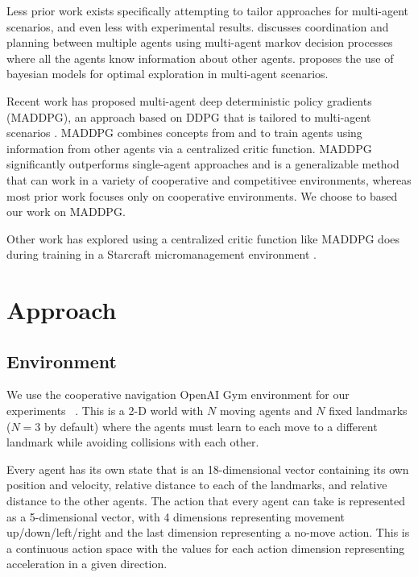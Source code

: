 \documentclass{article}
\begin{document}
Less prior work exists specifically attempting to tailor approaches for multi-agent scenarios, and even less with experimental results. \cite{boutilier1996planning} discusses coordination and planning between multiple agents using multi-agent markov decision processes where all the agents know information about other agents. \cite{chalkiadakis2003coordination} proposes the use of bayesian models for optimal exploration in multi-agent scenarios.

Recent work has proposed multi-agent deep deterministic policy gradients (MADDPG), an approach based on DDPG that is tailored to multi-agent scenarios \cite{maddpg}. MADDPG combines concepts from \cite{suttonbarto1998rl} and \cite{lillicrap2015continuous} to train agents using information from other agents via a centralized critic function. MADDPG significantly outperforms single-agent approaches and is a generalizable method that can work in a variety of cooperative and competitivee environments, whereas most prior work focuses only on cooperative environments. We choose to based our work on MADDPG.

Other work has explored using a centralized critic function like MADDPG does during training in a Starcraft micromanagement environment \cite{coma}.

\section{Approach}

\subsection{Environment}

We use the cooperative navigation OpenAI Gym environment for our experiments ~\cite{openaigym}. This is a 2-D world with $N$ moving agents and $N$ fixed landmarks ($N=3$ by default) where the agents must learn to each move to a different landmark while avoiding collisions with each other.

Every agent has its own state that is an 18-dimensional vector containing its own position and velocity, relative distance to each of the landmarks, and relative distance to the other agents. The action that every agent can take is represented as a 5-dimensional vector, with 4 dimensions representing movement up/down/left/right and the last dimension representing a no-move action. This is a continuous action space with the values for each action dimension representing acceleration in a given direction.
\end{document}
